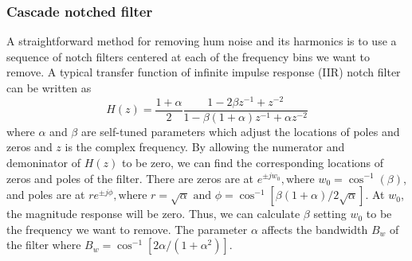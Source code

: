 \documentclass[paper-main.tex]{subfiles}
\begin{document}
\subsubsection{Cascade notched filter}
A straightforward method for removing hum noise and its harmonics is to use a sequence of notch filters centered at each of the frequency bins we want to remove. 
A typical transfer function of infinite impulse response (IIR) notch filter can be written as \citep{10.5555/541204}
\begin{equation}
    \label{eqn:notch}
    H(z)=\frac{1+\alpha}{2}\frac{1-2\beta z^{-1}+z^{-2}}{1-\beta(1+\alpha)z^{-1}+\alpha z^{-2}}
\end{equation}
where $\alpha$ and $\beta$ are self-tuned parameters which adjust the locations of poles and zeros and $z$ is the complex frequency. 
By allowing the numerator and demoninator of $H(z)$ to be zero, we can find the corresponding locations of zeros and poles of the filter. 
There are zeros are at $e^{\pm jw_0}, \text{where } w_0=\cos^{-1}(\beta)$, and poles are at $re^{\pm j\phi}, \text{where } r=\sqrt{\alpha} \text{ and }\phi=\cos^{-1}[\beta(1+\alpha)/2\sqrt{\alpha}]$.
At $w_0$, the magnitude response will be zero. 
Thus, we can calculate $\beta$ setting $w_0$ to be the frequency we want to remove. 
The parameter $\alpha$ affects the bandwidth $B_w$ of the filter where $B_w=\cos^{-1}[2\alpha/(1+\alpha^2)]$. 
\end{document}
